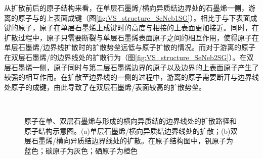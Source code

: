     从扩散前后的原子结构来看，在单层石墨烯/横向异质结边界处的石墨烯一侧，游离的原子与的上表面成键（图\ref{fig:VS_structure_SeNeb1SG}）。相比于与下表面成键的原子，原子在单层石墨烯上成键时的高度与相接的上表面更加接近。同时，在扩散过程中，原子只需要断裂与单层石墨烯表面原子之间的相互作用，使得原子在单层石墨烯/边界线扩散时的扩散势垒远低与原子扩散的情况。而对于游离的原子在双层石墨烯/的边界线处的扩散行为（图\ref{fig:VS_structure_SeNeb2SG}）。在双层石墨烯一侧，原子同时与第二层石墨烯边界的原子以及边界的上表面原子产生了较强的相互作用。在扩散至边界线的一侧的过程中，游离的原子需要断开与边界线处原子的成键，由此导致了在双层石墨烯/表面较高的扩散势垒。

    \begin{figure}[htb]
        \\[-0.5ex]
        \caption{原子在单、双层石墨烯与形成的横向异质结的边界线处的扩散路径和原子结构示意图。(a)单层石墨烯/横向异质结边界线处的扩散；(b)双层石墨烯/横向异质结边界线处的扩散。在原子结构图中，钒原子为蓝色；碳原子为灰色；硒原子为橙色}
        \label{fig:VS_structure_SeNeb}
    \end{figure}


